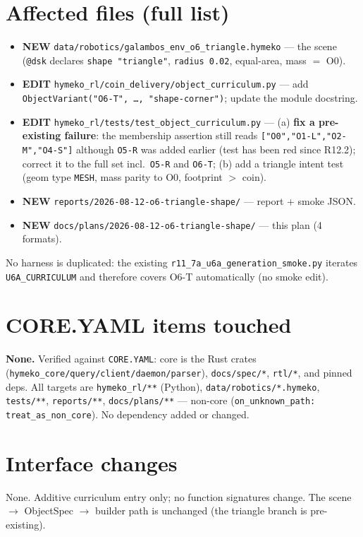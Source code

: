 \documentclass[11pt]{article}
\begin{document}
\section{Affected files (full list)}
\begin{itemize}[nosep]
  \item \textbf{NEW} \texttt{data/robotics/galambos\_env\_o6\_triangle.hymeko} --- the scene
    (\texttt{@dsk} declares \texttt{shape "triangle"}, \texttt{radius 0.02}, equal-area, mass $=$ O0).
  \item \textbf{EDIT} \texttt{hymeko\_rl/coin\_delivery/object\_curriculum.py} --- add
    \texttt{ObjectVariant("O6-T", \ldots, "shape-corner")}; update the module docstring.
  \item \textbf{EDIT} \texttt{hymeko\_rl/tests/test\_object\_curriculum.py} --- (a) \textbf{fix a
    pre-existing failure}: the membership assertion still reads \texttt{["O0","O1-L","O2-M","O4-S"]}
    although \texttt{O5-R} was added earlier (test has been red since R12.2); correct it to the full
    set incl.\ \texttt{O5-R} and \texttt{O6-T}; (b) add a triangle intent test (geom type
    \texttt{MESH}, mass parity to O0, footprint $>$ coin).
  \item \textbf{NEW} \texttt{reports/2026-08-12-o6-triangle-shape/} --- report + smoke JSON.
  \item \textbf{NEW} \texttt{docs/plans/2026-08-12-o6-triangle-shape/} --- this plan (4 formats).
\end{itemize}
No harness is duplicated: the existing \texttt{r11\_7a\_u6a\_generation\_smoke.py} iterates
\texttt{U6A\_CURRICULUM} and therefore covers O6-T automatically (no smoke edit).

\section{CORE.YAML items touched}
\textbf{None.} Verified against \texttt{CORE.YAML}: core is the Rust crates
(\texttt{hymeko\_core/query/client/daemon/parser}), \texttt{docs/spec/*}, \texttt{rtl/*}, and pinned
deps. All targets are \texttt{hymeko\_rl/**} (Python), \texttt{data/robotics/*.hymeko},
\texttt{tests/**}, \texttt{reports/**}, \texttt{docs/plans/**} --- non-core (\texttt{on\_unknown\_path:
treat\_as\_non\_core}). No dependency added or changed.

\section{Interface changes}
None. Additive curriculum entry only; no function signatures change. The scene $\to$ ObjectSpec
$\to$ builder path is unchanged (the triangle branch is pre-existing).
\end{document}
